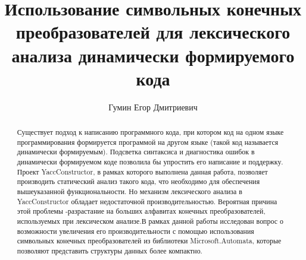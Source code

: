 \title{Использование символьных конечных преобразователей для лексического анализа динамически формируемого кода}


\author{Гумин Егор Дмитриевич}



\maketitle             

\begin{abstract}
Существует подход к написанию программного кода, при котором код на одном языке программирования формируется программой на другом языке (такой код называется динамически формируемым). Подсветка синтаксиса и диагностика ошибок в динамически формируемом коде позволила бы упростить его написание и поддержку. Проект YaccConstructor, в рамках которого выполнена данная работа, позволяет производить статический анализ такого кода, что необходимо для обеспечения вышеуказанной функциональности. Но механизм лексического анализа в YaccConstructor обладает недостаточной производительностью. Вероятная причина этой проблемы -разрастание на больших алфавитах конечных преобразователей, используемых при лексическом анализе.В рамках данной работы исследован вопрос о возможности увеличения его производительности с помощью использования символьных конечных преобразователей из библиотеки Microsoft.Automata, которые позволяют представить структуры данных более компактно.
\end{abstract}







